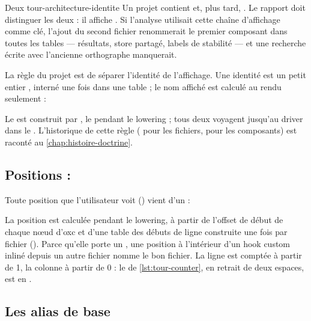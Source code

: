 \begin{exemple}{Deux }{tour-architecture-identite}
Un projet contient  et, plus tard, . Le rapport doit distinguer les deux : il affiche . Si l'analyse utilisait cette chaîne d'affichage comme clé, l'ajout du second fichier renommerait le premier composant dans toutes les tables --- résultats, store partagé, labels de stabilité --- et une recherche écrite avec l'ancienne orthographe manquerait.
\end{exemple}

La règle du projet est de séparer l'identité de l'affichage. Une identité est un petit entier , interné une fois dans une table ; le nom affiché est calculé au rendu seulement :



Le  est construit par , le  pendant le lowering ; tous deux voyagent jusqu'au driver dans le . L'historique de cette règle ( pour les fichiers,  pour les composants) est raconté au \cref{chap:histoire-doctrine}.

\subsection{Positions : }

Toute position que l'utilisateur voit () vient d'un  :


La position est calculée pendant le lowering, à partir de l'offset de début de chaque nœud d'oxc et d'une table des débuts de ligne construite une fois par fichier (). Parce qu'elle porte un , une position à l'intérieur d'un hook custom inliné depuis un autre fichier nomme le bon fichier. La ligne est comptée à partir de 1, la colonne à partir de 0 : le  de \cref{lst:tour-counter}, en retrait de deux espaces, est en .

\subsection{Les alias de base}

